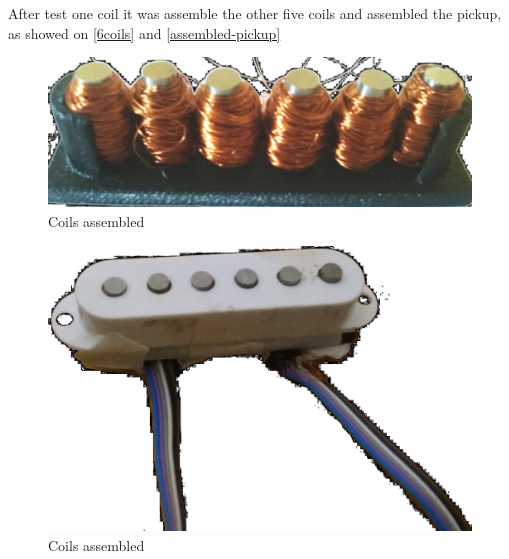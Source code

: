 After test one coil it was assemble the other five coils and assembled the pickup, as
showed on \autoref{6coils} and \autoref{assembled-pickup}

\begin{figure}[!htpb]
  \centering
  \caption{Coils assembled}
  \label{6coils}
  \includegraphics[scale=0.08]{images/6coils}
\end{figure}

\begin{figure}[!htpb]
  \centering
  \caption{Coils assembled}
  \label{assembled-pickup}
  \includegraphics[scale=0.08]{images/assembled-pickup}
\end{figure}
